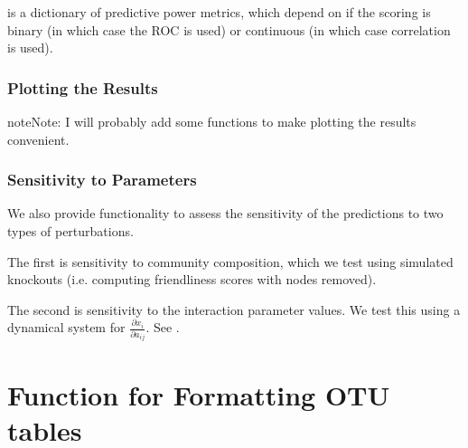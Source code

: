 \documentclass[letterpaper,10pt,english]{sphinxmanual}
\begin{document}
\begin{sphinxVerbatim}[commandchars=\\\{\}]
   

  
\end{sphinxVerbatim}

\sphinxAtStartPar
{} is a dictionary of predictive power metrics, which depend on if the scoring is binary (in which case the ROC is used) or continuous (in which case correlation is used).


\subsection{Plotting the Results}
\label{\detokenize{usage:plotting-the-results}}
\begin{sphinxadmonition}{note}{Note:}
\sphinxAtStartPar
I will probably add some functions to make plotting the results convenient.
\end{sphinxadmonition}


\subsection{Sensitivity to Parameters}
\label{\detokenize{usage:sensitivity-to-parameters}}
\sphinxAtStartPar
We also provide functionality to assess the sensitivity of the predictions to two types of perturbations.

\sphinxAtStartPar
The first is sensitivity to community composition, which we test using simulated knock\sphinxhyphen{}outs (i.e. computing friendliness scores with nodes removed).

\sphinxAtStartPar
The second is sensitivity to the interaction parameter values. We test this using a dynamical system for \(\frac{\partial x_i}{\partial a_{ij}}\). See {\hyperref[\detokenize{sensit::doc}]{}}.

\sphinxstepscope


\chapter{Function for Formatting OTU tables}
\label{\detokenize{format:function-for-formatting-otu-tables}}\label{\detokenize{format::doc}}
\end{document}
